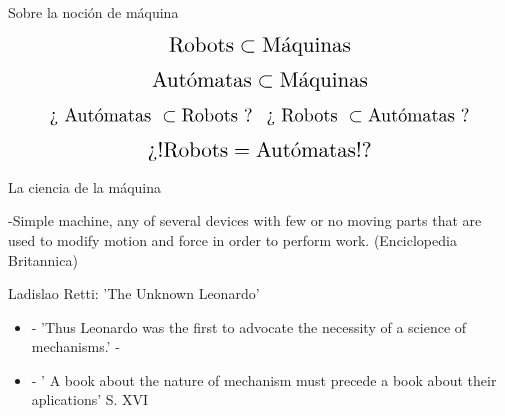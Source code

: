 
\newcommand*{\Scale}[2][4]{\scalebox{#1}{$#2$}}%

\begin{frame}[fragile]{Sobre la noción de máquina}

	\[ \Scale[1.5]{ \text{Robots} \subset \text{Máquinas} }\] 
	
	\pause
	
	\[ \Scale[1.5]{\text{Autómatas} \subset \text{Máquinas} 	}\]
	
	\pause
	
	\[ \Scale[1.3]{\text{¿ Autómatas } \subset \text{Robots ?} } \quad \Scale[1.3]{\text{¿ Robots } \subset \text{Autómatas ?}}	\]
	
	\[ \Scale[1.5]{ \text{¿!Robots} = \text{Autómatas!?}}  \]

\end{frame}


\begin{frame}[fragile]{La ciencia de la máquina}

-Simple machine, any of several devices with few or no moving parts that are used to modify
motion and force in order to perform work. (Enciclopedia Britannica)

\vspace{10px}
\pause
{}
\begin{block}{Ladislao Retti: ’The Unknown Leonardo’}
	\begin{itemize}
		\pause
		\item - ’Thus Leonardo was the first to advocate the necessity of a science of mechanisms.’ -

		\pause
		
		\item - ’ A book about the nature of mechanism must precede a book about their aplications’ S. XVI

	\end{itemize}
\end{block}

\end{frame}

